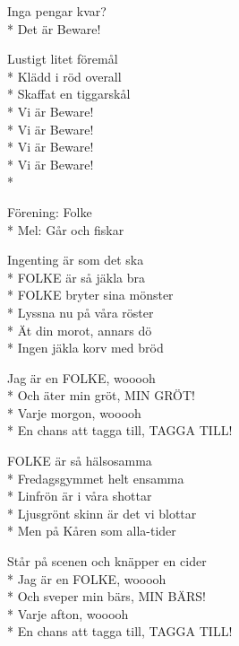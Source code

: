 \begin{SongText}[Vi är Beware!]
\begin{SongVerse}
        Inga pengar kvar?\\*%
        Det är Beware!
    \end{SongVerse}
    \begin{SongVerse}
        Lustigt litet föremål\\*%
        Klädd i röd overall\\*%
        Skaffat en tiggarskål\\*%
        Vi är Beware!\\*%
        Vi är Beware!\\*%
        Vi är Beware!\\*%
        Vi är Beware!\\*%
    \end{SongVerse}
\end{SongText}

\begin{SongText}
    \begin{SongInfo}
        Förening: Folke\\*%
        Mel: Går och fiskar
    \end{SongInfo}
    \begin{SongVerse}
        Ingenting är som det ska\\*%
        FOLKE är så jäkla bra\\*%
        FOLKE bryter sina mönster\\*%
        Lyssna nu på våra röster\\*%
        Ät din morot, annars dö\\*%
        Ingen jäkla korv med bröd
    \end{SongVerse}
    \begin{SongVerse}
        Jag är en FOLKE, wooooh\\*%
        Och äter min gröt, MIN GRÖT!\\*%
        Varje morgon, wooooh\\*%
        En chans att tagga till, TAGGA TILL!
    \end{SongVerse}
    \begin{SongVerse}
        FOLKE är så hälsosamma\\*%
        Fredagsgymmet helt ensamma\\*%
        Linfrön är i våra shottar\\*%
        Ljusgrönt skinn är det vi blottar\\*%
        Men på Kåren som alla-tider
    \end{SongVerse}
    \begin{SongVerse}
        Står på scenen och knäpper en cider\\*%
        Jag är en FOLKE, wooooh\\*%
        Och sveper min bärs, MIN BÄRS!\\*%
        Varje afton, wooooh\\*%
        En chans att tagga till, TAGGA TILL!
    \end{SongVerse}
\end{SongText}

